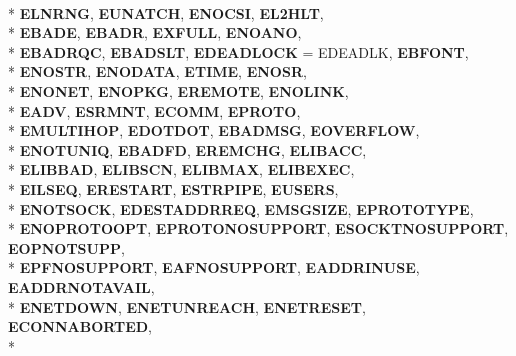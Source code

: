 \begin{DoxyCompactItemize}
\\*
{\bfseries E\+L\+N\+R\+NG}, 
{\bfseries E\+U\+N\+A\+T\+CH}, 
{\bfseries E\+N\+O\+C\+SI}, 
{\bfseries E\+L2\+H\+LT}, 
\\*
{\bfseries E\+B\+A\+DE}, 
{\bfseries E\+B\+A\+DR}, 
{\bfseries E\+X\+F\+U\+LL}, 
{\bfseries E\+N\+O\+A\+NO}, 
\\*
{\bfseries E\+B\+A\+D\+R\+QC}, 
{\bfseries E\+B\+A\+D\+S\+LT}, 
{\bfseries E\+D\+E\+A\+D\+L\+O\+CK} = E\+D\+E\+A\+D\+LK, 
{\bfseries E\+B\+F\+O\+NT}, 
\\*
{\bfseries E\+N\+O\+S\+TR}, 
{\bfseries E\+N\+O\+D\+A\+TA}, 
{\bfseries E\+T\+I\+ME}, 
{\bfseries E\+N\+O\+SR}, 
\\*
{\bfseries E\+N\+O\+N\+ET}, 
{\bfseries E\+N\+O\+P\+KG}, 
{\bfseries E\+R\+E\+M\+O\+TE}, 
{\bfseries E\+N\+O\+L\+I\+NK}, 
\\*
{\bfseries E\+A\+DV}, 
{\bfseries E\+S\+R\+M\+NT}, 
{\bfseries E\+C\+O\+MM}, 
{\bfseries E\+P\+R\+O\+TO}, 
\\*
{\bfseries E\+M\+U\+L\+T\+I\+H\+OP}, 
{\bfseries E\+D\+O\+T\+D\+OT}, 
{\bfseries E\+B\+A\+D\+M\+SG}, 
{\bfseries E\+O\+V\+E\+R\+F\+L\+OW}, 
\\*
{\bfseries E\+N\+O\+T\+U\+N\+IQ}, 
{\bfseries E\+B\+A\+D\+FD}, 
{\bfseries E\+R\+E\+M\+C\+HG}, 
{\bfseries E\+L\+I\+B\+A\+CC}, 
\\*
{\bfseries E\+L\+I\+B\+B\+AD}, 
{\bfseries E\+L\+I\+B\+S\+CN}, 
{\bfseries E\+L\+I\+B\+M\+AX}, 
{\bfseries E\+L\+I\+B\+E\+X\+EC}, 
\\*
{\bfseries E\+I\+L\+S\+EQ}, 
{\bfseries E\+R\+E\+S\+T\+A\+RT}, 
{\bfseries E\+S\+T\+R\+P\+I\+PE}, 
{\bfseries E\+U\+S\+E\+RS}, 
\\*
{\bfseries E\+N\+O\+T\+S\+O\+CK}, 
{\bfseries E\+D\+E\+S\+T\+A\+D\+D\+R\+R\+EQ}, 
{\bfseries E\+M\+S\+G\+S\+I\+ZE}, 
{\bfseries E\+P\+R\+O\+T\+O\+T\+Y\+PE}, 
\\*
{\bfseries E\+N\+O\+P\+R\+O\+T\+O\+O\+PT}, 
{\bfseries E\+P\+R\+O\+T\+O\+N\+O\+S\+U\+P\+P\+O\+RT}, 
{\bfseries E\+S\+O\+C\+K\+T\+N\+O\+S\+U\+P\+P\+O\+RT}, 
{\bfseries E\+O\+P\+N\+O\+T\+S\+U\+PP}, 
\\*
{\bfseries E\+P\+F\+N\+O\+S\+U\+P\+P\+O\+RT}, 
{\bfseries E\+A\+F\+N\+O\+S\+U\+P\+P\+O\+RT}, 
{\bfseries E\+A\+D\+D\+R\+I\+N\+U\+SE}, 
{\bfseries E\+A\+D\+D\+R\+N\+O\+T\+A\+V\+A\+IL}, 
\\*
{\bfseries E\+N\+E\+T\+D\+O\+WN}, 
{\bfseries E\+N\+E\+T\+U\+N\+R\+E\+A\+CH}, 
{\bfseries E\+N\+E\+T\+R\+E\+S\+ET}, 
{\bfseries E\+C\+O\+N\+N\+A\+B\+O\+R\+T\+ED}, 
\\*

\end{DoxyCompactItemize}
